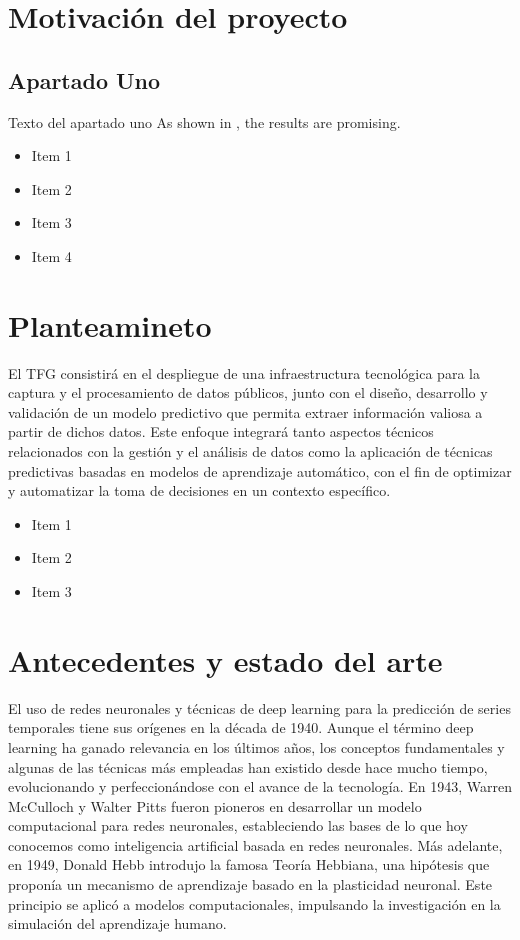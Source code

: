 \section{Motivación del proyecto}
\subsection{Apartado Uno}
\begin{large}
Texto del apartado uno
As shown in \cite{smith2023}, the results are promising.

\begin{itemize}
   \item Item 1
   \item Item 2
   \item Item 3
   \item Item 4
\end{itemize}
\end{large}

\section{Planteamineto}
El TFG consistirá en el despliegue de una infraestructura tecnológica para la captura y el procesamiento de datos públicos, 
junto con el diseño, desarrollo y validación de un modelo predictivo que permita extraer información valiosa a partir de dichos datos.
 Este enfoque integrará tanto aspectos técnicos relacionados con la gestión y el análisis de datos como la aplicación de técnicas predictivas
  basadas en modelos de aprendizaje automático, con el fin de optimizar y automatizar la toma de decisiones en un contexto específico.
\begin{large}
\begin{itemize}
   \item Item 1
   \item Item 2
   \item Item 3
\end{itemize}
\end{large}

\section{Antecedentes y estado del arte}

El uso de redes neuronales y técnicas de deep learning para la predicción de series temporales tiene sus orígenes en la década de 1940. Aunque el término deep learning ha ganado relevancia en los últimos años, los conceptos fundamentales y algunas de las técnicas más empleadas han existido desde hace mucho tiempo, evolucionando y perfeccionándose con el avance de la tecnología.
En 1943, Warren McCulloch y Walter Pitts fueron pioneros en desarrollar un modelo computacional para redes neuronales, estableciendo las bases de lo que hoy conocemos como inteligencia artificial basada en redes neuronales. Más adelante, en 1949, Donald Hebb introdujo la famosa Teoría Hebbiana, una hipótesis que proponía un mecanismo de aprendizaje basado en la plasticidad neuronal. Este principio se aplicó a modelos computacionales, impulsando la investigación en la simulación del aprendizaje humano.


